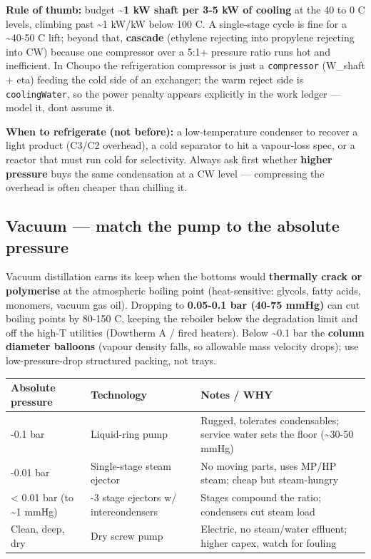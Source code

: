 \documentclass[11pt,a4paper]{article}
\begin{document}
\textbf{Rule of thumb:} budget \textbf{\textasciitilde1 kW shaft per 3-5
kW of cooling} at the \textminus{}40 to 0 C levels, climbing past \textasciitilde1
kW/kW below \textminus{}100 C. A single-stage cycle is fine for a
\textasciitilde40-50 C lift; beyond that, \textbf{cascade} (ethylene
rejecting into propylene rejecting into CW) because one compressor over
a 5:1+ pressure ratio runs hot and inefficient. In Choupo the
refrigeration compressor is just a \texttt{compressor} (W\_shaft + eta)
feeding the cold side of an exchanger; the warm reject side is
\texttt{coolingWater}, so the power penalty appears explicitly in the
work ledger --- model it, don\textquotesingle t assume it.

\textbf{When to refrigerate (not before):} a low-temperature condenser
to recover a light product (C3/C2 overhead), a cold separator to hit a
vapour-loss spec, or a reactor that must run cold for selectivity.
Always ask first whether \textbf{higher pressure} buys the same
condensation at a CW level --- compressing the overhead is often cheaper
than chilling it.

\hypertarget{vacuum--match-the-pump-to-the-absolute-pressure}{%
\subsection{Vacuum --- match the pump to the absolute
pressure}\label{vacuum--match-the-pump-to-the-absolute-pressure}}

Vacuum distillation earns its keep when the bottoms would
\textbf{thermally crack or polymerise} at the atmospheric boiling point
(heat-sensitive: glycols, fatty acids, monomers, vacuum gas oil).
Dropping to \textbf{0.05-0.1 bar (40-75 mmHg)} can cut boiling points by
80-150 C, keeping the reboiler below the degradation limit and off the
high-T utilities (Dowtherm A / fired heaters). Below \textasciitilde0.1
bar the \textbf{column diameter balloons} (vapour density falls, so
allowable mass velocity drops); use low-pressure-drop structured
packing, not trays.

\begin{longtable}[]{@{}>{\raggedright\arraybackslash}p{\dimexpr(\linewidth-6\tabcolsep)/3\relax}>{\raggedright\arraybackslash}p{\dimexpr(\linewidth-6\tabcolsep)/3\relax}>{\raggedright\arraybackslash}p{\dimexpr(\linewidth-6\tabcolsep)/3\relax}@{}}
\toprule\noalign{}
Absolute pressure & Technology & Notes / WHY \\
\midrule\noalign{}
\endhead
\bottomrule\noalign{}
\endlastfoot
1-0.1 bar & Liquid-ring pump & Rugged, tolerates condensables; service
water sets the floor (\textasciitilde30-50 mmHg) \\
0.1-0.01 bar & Single-stage steam ejector & No moving parts, uses MP/HP
steam; cheap but steam-hungry \\
\textless{} 0.01 bar (to \textasciitilde1 mmHg) & 2-3 stage ejectors w/
intercondensers & Stages compound the ratio; condensers cut steam
load \\
Clean, deep, dry & Dry screw pump & Electric, no steam/water effluent;
higher capex, watch for fouling \\
\end{longtable}
\end{document}
